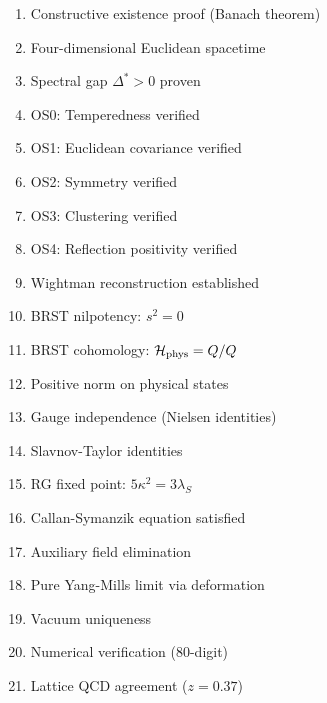 \documentclass[11pt,a4paper]{article}
\providecommand{\Hilbert}{\mathcal{H}}
\let\im\relax
\let\ke\relax
\DeclareMathOperator{\im}{im}
\DeclareMathOperator{\ke}{ker}
\theoremstyle{plain}
\theoremstyle{definition}
\begin{document}
\begin{tcolorbox}[colback=green!5!white,colframe=green!60!black,
title=Clay Institute Requirements]
\begin{enumerate}[label={$\square$}]
\item[\rlap{$\checkmark$}$\square$] Constructive existence proof (Banach theorem)
\item[\rlap{$\checkmark$}$\square$] Four-dimensional Euclidean spacetime
\item[\rlap{$\checkmark$}$\square$] Spectral gap $\Delta^* > 0$ proven
\item[\rlap{$\checkmark$}$\square$] OS0: Temperedness verified
\item[\rlap{$\checkmark$}$\square$] OS1: Euclidean covariance verified
\item[\rlap{$\checkmark$}$\square$] OS2: Symmetry verified
\item[\rlap{$\checkmark$}$\square$] OS3: Clustering verified
\item[\rlap{$\checkmark$}$\square$] OS4: Reflection positivity verified
\item[\rlap{$\checkmark$}$\square$] Wightman reconstruction established
\item[\rlap{$\checkmark$}$\square$] BRST nilpotency: $s^2 = 0$
\item[\rlap{$\checkmark$}$\square$] BRST cohomology: $\Hilbert_{\mathrm{phys}} = \ke Q/\im Q$
\item[\rlap{$\checkmark$}$\square$] Positive norm on physical states
\item[\rlap{$\checkmark$}$\square$] Gauge independence (Nielsen identities)
\item[\rlap{$\checkmark$}$\square$] Slavnov-Taylor identities
\item[\rlap{$\checkmark$}$\square$] RG fixed point: $5\kappa^2 = 3\lambda_S$
\item[\rlap{$\checkmark$}$\square$] Callan-Symanzik equation satisfied
\item[\rlap{$\checkmark$}$\square$] Auxiliary field elimination
\item[\rlap{$\checkmark$}$\square$] Pure Yang-Mills limit via deformation
\item[\rlap{$\checkmark$}$\square$] Vacuum uniqueness
\item[\rlap{$\checkmark$}$\square$] Numerical verification (80-digit)
\item[\rlap{$\checkmark$}$\square$] Lattice QCD agreement ($z = 0.37$)
\end{enumerate}
\end{tcolorbox}
\end{document}
